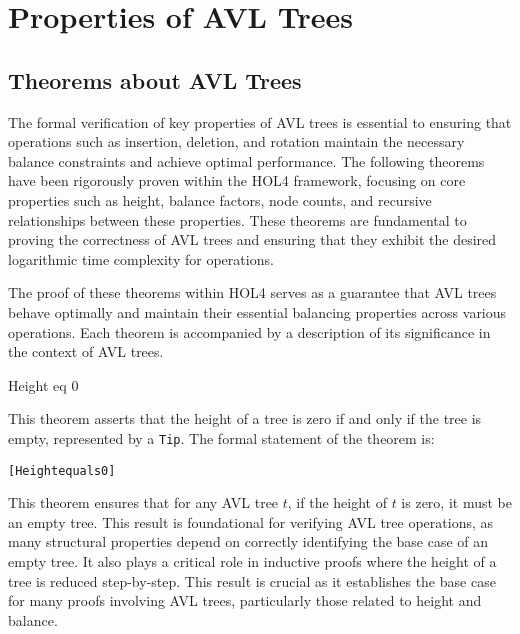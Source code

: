 \chapter{Properties of AVL Trees}\label{chap:content}


\section{Theorems about AVL Trees}

The formal verification of key properties of AVL trees is essential to ensuring that operations such as insertion, deletion, and rotation maintain the necessary balance constraints and achieve optimal performance. The following theorems have been rigorously proven within the HOL4 framework, focusing on core properties such as height, balance factors, node counts, and recursive relationships between these properties. These theorems are fundamental to proving the correctness of AVL trees and ensuring that they exhibit the desired logarithmic time complexity for operations.

The proof of these theorems within HOL4 serves as a guarantee that AVL trees behave optimally and maintain their essential balancing properties across various operations. Each theorem is accompanied by a description of its significance in the context of AVL trees.

	
	\begin{thm}{Height eq 0}

    This theorem asserts that the height of a tree is zero if and only if the tree is empty, represented by a \texttt{Tip}. The formal statement of the theorem is:

    \begin{alltt}
    	[Height equals 0]
    \end{alltt}
    
    
    \end{thm}

    This theorem ensures that for any AVL tree \(t\), if the height of \(t\) is zero, it must be an empty tree. This result is foundational for verifying AVL tree operations, as many structural properties depend on correctly identifying the base case of an empty tree. It also plays a critical role in inductive proofs where the height of a tree is reduced step-by-step. This result is crucial as it establishes the base case for many proofs involving AVL trees, particularly those related to height and balance.

